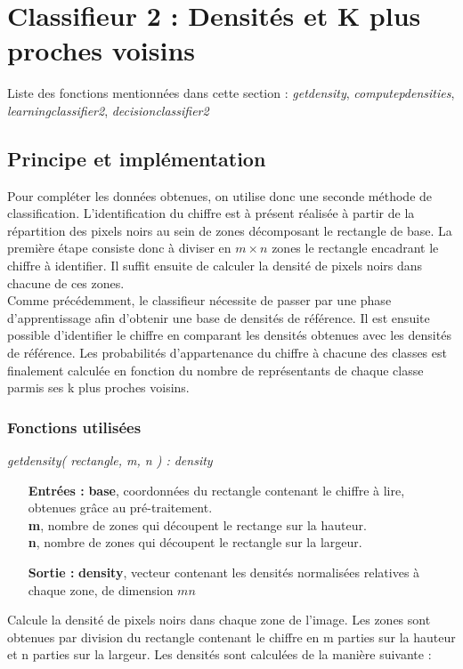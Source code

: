 \section{Classifieur 2 : Densités et K plus proches voisins}
Liste des fonctions mentionnées dans cette section : \textit{getdensity}, \textit{computepdensities}, \textit{learningclassifier2}, \textit{decisionclassifier2}

\subsection{Principe et implémentation}

Pour compléter les données obtenues, on utilise donc une seconde méthode de classification. L'identification du chiffre est à présent réalisée à partir de la répartition des pixels noirs au sein de zones décomposant le rectangle de base. La première étape consiste donc à diviser en $m\times n$ zones le rectangle encadrant le chiffre à identifier. Il suffit ensuite de calculer la densité de pixels noirs dans chacune de ces zones.\\

Comme précédemment, le classifieur nécessite de passer par une phase d'apprentissage afin d'obtenir une base de densités de référence. Il est ensuite possible d'identifier le chiffre en comparant les densités obtenues avec les densités de référence. Les probabilités d'appartenance du chiffre à chacune des classes est finalement calculée en fonction du nombre de représentants de chaque classe parmis ses k plus proches voisins.

\subsubsection{Fonctions utilisées}

\textit{getdensity( rectangle, m, n ) : density}\\
\begin{itemize}
	\item[\textbf{Entrées :}] \textbf{base}, coordonnées du rectangle contenant le chiffre à lire, obtenues grâce au pré-traitement. \\\textbf{m}, nombre de zones qui découpent le rectange sur la hauteur. \\\textbf{n}, nombre de zones qui découpent le rectangle sur la largeur.
	\item[\textbf{Sortie :}] \textbf{density}, vecteur contenant les densités normalisées relatives à chaque zone, de dimension $mn$
\end{itemize}
Calcule la densité de pixels noirs dans chaque zone de l'image. Les zones sont obtenues par division du rectangle contenant le chiffre en m parties sur la hauteur et n parties sur la largeur. Les densités sont calculées de la manière suivante :

